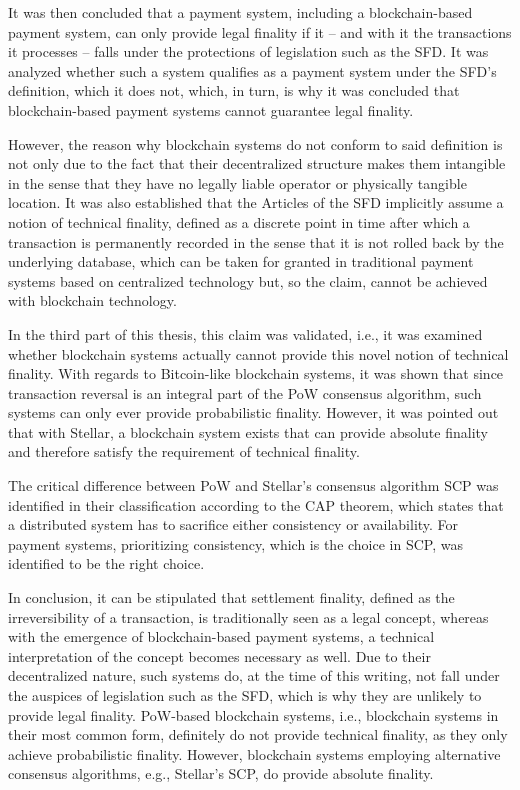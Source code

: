 It was then concluded that a payment system, including a blockchain-based payment system, can only provide legal finality if it -- and with it the transactions it processes -- falls under the protections of legislation such as the SFD.
It was analyzed whether such a system qualifies as a payment system under the SFD's definition, which it does not, which, in turn, is why it was concluded that blockchain-based payment systems cannot guarantee legal finality.

However, the reason why blockchain systems do not conform to said definition is not only due to the fact that their decentralized structure makes them intangible in the sense that they have no legally liable operator or physically tangible location.
It was also established that the Articles of the SFD implicitly assume a notion of technical finality, defined as a discrete point in time after which a transaction is permanently recorded in the sense that it is not rolled back by the underlying database, which can be taken for granted in traditional payment systems based on centralized technology but, so the claim, cannot be achieved with blockchain technology.

In the third part of this thesis, this claim was validated, i.e., it was examined whether blockchain systems actually cannot provide this novel notion of technical finality.
With regards to Bitcoin-like blockchain systems, it was shown that since transaction reversal is an integral part of the PoW consensus algorithm, such systems can only ever provide probabilistic finality.
However, it was pointed out that with Stellar, a blockchain system exists that can provide absolute finality and therefore satisfy the requirement of technical finality.

The critical difference between PoW and Stellar's consensus algorithm SCP was identified in their classification according to the CAP theorem, which states that a distributed system has to sacrifice either consistency or availability.
For payment systems, prioritizing consistency, which is the choice in SCP, was identified to be the right choice.

In conclusion, it can be stipulated that settlement finality, defined as the irreversibility of a transaction, is traditionally seen as a legal concept, whereas with the emergence of blockchain-based payment systems, a technical interpretation of the concept becomes necessary as well.
Due to their decentralized nature, such systems do, at the time of this writing, not fall under the auspices of legislation such as the SFD, which is why they are unlikely to provide legal finality.
PoW-based blockchain systems, i.e., blockchain systems in their most common form, definitely do not provide technical finality, as they only achieve probabilistic finality.
However, blockchain systems employing alternative consensus algorithms, e.g., Stellar's SCP, do provide absolute finality.

